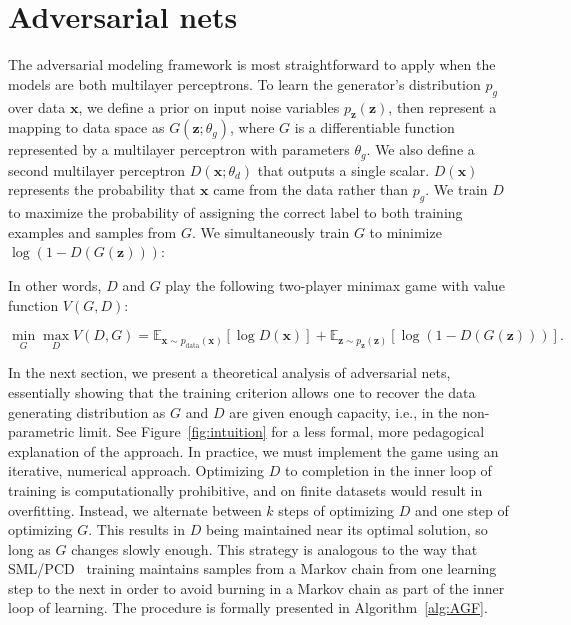 \documentclass{article} %
\begin{document}
\section{Adversarial nets}

The adversarial modeling framework is most straightforward to apply when the models are both
multilayer perceptrons. To learn the generator's distribution $p_g$ over data $\bm{x}$, we
define a prior on input noise variables $p_{\bm{z}}(\bm{z})$, then represent a
mapping to data space as $G(\bm{z}; \theta_g)$, where $G$ is a differentiable function
represented by a multilayer perceptron with parameters $\theta_g$. We also define a second
multilayer perceptron $D(\bm{x}; \theta_d)$ that outputs a single scalar. $D(\bm{x})$ represents
the probability that $\bm{x}$ came from the data rather than $p_g$. We train $D$ to maximize the
probability of assigning the correct label to both training examples and samples from $G$.
We simultaneously train $G$ to minimize $\log(1-D(G(\bm{z})))$:

In other words, $D$ and $G$ play the following two-player minimax game with value function $V(G, D)$: 

\begin{equation}
\label{eq:minimaxgame-definition}
\min_G \max_D V(D, G) = \mathbb{E}_{\bm{x} \sim p_{\text{data}}(\bm{x})}[\log D(\bm{x})] + \mathbb{E}_{\bm{z} \sim p_{\bm{z}}(\bm{z})}[\log (1 - D(G(\bm{z})))].
\end{equation}

In the next section, we present a theoretical analysis of adversarial nets,
essentially showing that the training criterion allows one to recover the data
generating distribution as $G$ and $D$ are given enough capacity, i.e., in the
non-parametric limit. See Figure~\ref{fig:intuition} for a less formal, more pedagogical
explanation of the approach.
In practice, we must implement the game using an iterative, numerical approach. Optimizing $D$ to completion in the
inner loop of training is computationally prohibitive,
and on finite datasets would result in overfitting. Instead, we alternate between $k$ steps
of optimizing $D$ and one step of optimizing $G$. This results in $D$ being maintained
near its optimal solution, so long as $G$ changes slowly enough. This strategy is analogous
to the way that SML/PCD~\citep{Younes1999,Tieleman08} training maintains samples from a Markov chain from one
learning step to the next in order to avoid burning in a Markov chain as part of the inner loop
of learning. The procedure is formally presented
in Algorithm~\ref{alg:AGF}.
\end{document}

